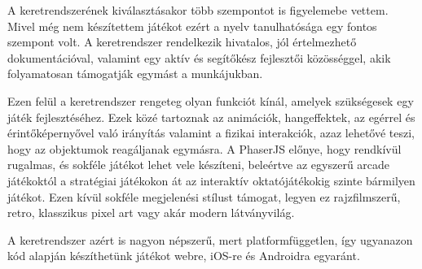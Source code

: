\documentclass[12pt, a4paper]{report}
\theoremstyle{definition}
\begin{document}
	A keretrendszerének kiválasztásakor több szempontot is figyelemebe vettem. Mivel még nem készítettem játékot ezért a nyelv tanulhatósága egy fontos szempont volt. A keretrendszer rendelkezik hivatalos, jól értelmezhető dokumentációval, valamint egy aktív és segítőkész fejlesztői közösséggel, akik folyamatosan támogatják egymást a munkájukban.
	
	Ezen felül a keretrendszer rengeteg olyan funkciót kínál, amelyek szükségesek egy játék fejlesztéséhez. Ezek közé tartoznak az animációk, hangeffektek, az egérrel és érintőképernyővel való irányítás valamint a fizikai interakciók, azaz lehetővé teszi, hogy az objektumok reagáljanak egymásra. A PhaserJS előnye, hogy rendkívül rugalmas, és sokféle játékot lehet vele készíteni, beleértve az egyszerű arcade játékoktól a stratégiai játékokon át az interaktív oktatójátékokig szinte bármilyen játékot. Ezen kívül sokféle megjelenési stílust támogat, legyen ez rajzfilmszerű, retro, klasszikus pixel art vagy akár modern látványvilág.
	
	A keretrendszer azért is nagyon népszerű, mert platformfüggetlen, így ugyanazon kód alapján készíthetünk játékot webre, iOS-re és Androidra egyaránt.
	
\end{document}
